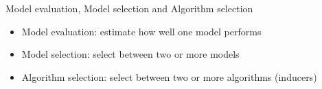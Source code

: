 \documentclass[11pt,compress,t,notes=noshow, xcolor=table]{beamer}
\date{}
\begin{document}


\begin{frame}{Model evaluation, Model selection and Algorithm selection}
\vfill
\begin{itemize}
    \item Model evaluation: estimate how well one model performs
    \item Model selection: select between two or more models
    \item Algorithm selection: select between two or more algorithms (inducers)
\end{itemize}
\vfill
\end{frame}


\end{document}
